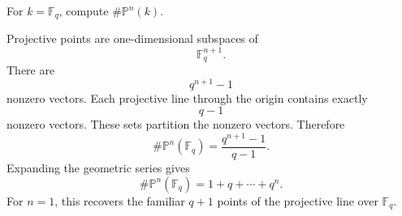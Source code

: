 \begin{problem}\label{prob:vi36-14}
For \(k=\mathbb F_q\), compute \(\#\mathbb P^n(k)\).

\end{problem}

\ifdefined\FullProblemDossiers
\begin{solution}
Projective points are one-dimensional subspaces of
\[
\mathbb F_q^{n+1}.
\]
There are
\[
q^{n+1}-1
\]
nonzero vectors. Each projective line through the origin contains exactly
\[
q-1
\]
nonzero vectors. These sets partition the nonzero vectors. Therefore
\[
\#\mathbb P^n(\mathbb F_q)
=
\frac{q^{n+1}-1}{q-1}.
\]
Expanding the geometric series gives
\[
\boxed{
\#\mathbb P^n(\mathbb F_q)
=
1+q+\cdots+q^n.
}
\]
For \(n=1\), this recovers the familiar \(q+1\) points of the projective line over \(\mathbb F_q\).
\end{solution}
\fi
